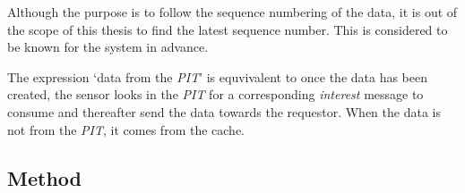 Although the purpose is to follow the sequence numbering of the data, it is out of the scope of this thesis to find the latest sequence number. This is considered to be known for the system in advance.

The expression `data from the \textit{PIT}' is equvivalent to once the data has been created, the sensor looks in the \textit{PIT} for a corresponding \textit{interest} message to consume and thereafter send the data towards the requestor. When the data is not from the \textit{PIT}, it comes from the cache.

\subsection{Method}


